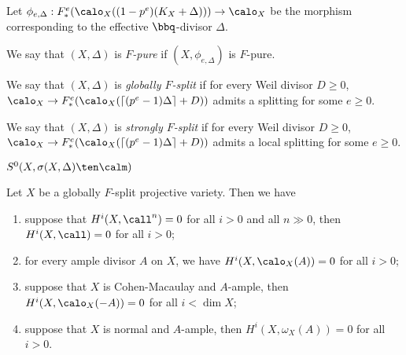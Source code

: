     \begin{definition}
        Let \(\phi_{e,\Delta}: F_*^e(\calo_X((1-p^e)(K_X + \Delta))) \to \calo_X\) be the morphism corresponding to the effective \(\bbq\)-divisor \(\Delta\).
        
        We say that \((X,\Delta)\) is \emph{\(F\)-pure} if \((X,\phi_{e,\Delta})\) is \(F\)-pure.
        
        We say that \((X,\Delta)\) is \emph{globally \(F\)-split} if for every Weil divisor \(D \geq 0\), \(\calo_X \to F_*^e(\calo_X(\lceil (p^e-1)\Delta \rceil + D))\) admits a splitting for some \(e \geq 0\).
        
        We say that \((X,\Delta)\) is \emph{strongly \(F\)-split} if for every Weil divisor \(D \geq 0\), \(\calo_X \to F_*^e(\calo_X(\lceil (p^e-1)\Delta \rceil + D))\) admits a local splitting for some \(e \geq 0\).
    \end{definition}

    \begin{definition}\label{def:test_ideals}
        
    \end{definition}

    \begin{definition}
        \(S^0(X,\sigma(X,\Delta)\ten \calm)\)
    \end{definition}

    \begin{proposition}
        Let \(X\) be a globally \(F\)-split projective variety.
        Then we have 
        \begin{enumerate}
            \item suppose that \(H^i(X,\call^{n}) = 0\) for all \(i > 0\) and all \(n \gg 0\), then \(H^i(X,\call) = 0\) for all \(i > 0\);
            \item for every ample divisor \(A\) on \(X\), we have \(H^i(X,\calo_X(A)) = 0\) for all \(i > 0\);
            \item suppose that \(X\) is Cohen-Macaulay and \(A\)-ample, then \(H^i(X,\calo_X(-A)) = 0\) for all \(i < \dim X\);
            \item suppose that \(X\) is normal and \(A\)-ample, then \(H^i(X,\omega_X(A)) = 0\) for all \(i>0\).
        \end{enumerate}
    \end{proposition}